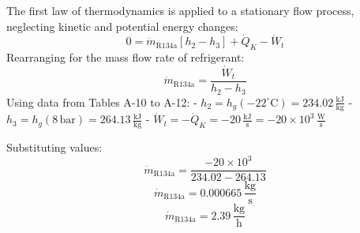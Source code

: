 The first law of thermodynamics is applied to a stationary flow process, neglecting kinetic and potential energy changes:  
\[
0 = \dot{m}_{\text{R134a}} \left[ h_2 - h_3 \right] + \dot{Q}_K - \dot{W}_t
\]  
Rearranging for the mass flow rate of refrigerant:  
\[
\dot{m}_{\text{R134a}} = \frac{\dot{W}_t}{h_2 - h_3}
\]  
Using data from Tables A-10 to A-12:  
- \( h_2 = h_g(-22^\circ\text{C}) = 234.02 \, \frac{\text{kJ}}{\text{kg}} \)  
- \( h_3 = h_g(8 \, \text{bar}) = 264.13 \, \frac{\text{kJ}}{\text{kg}} \)  
- \( \dot{W}_t = -\dot{Q}_K = -20 \, \frac{\text{kJ}}{\text{s}} = -20 \times 10^3 \, \frac{\text{W}}{\text{s}} \)  

Substituting values:  
\[
\dot{m}_{\text{R134a}} = \frac{-20 \times 10^3}{234.02 - 264.13}  
\]  
\[
\dot{m}_{\text{R134a}} = 0.000665 \, \frac{\text{kg}}{\text{s}}  
\]  
\[
\dot{m}_{\text{R134a}} = 2.39 \, \frac{\text{kg}}{\text{h}}  
\]